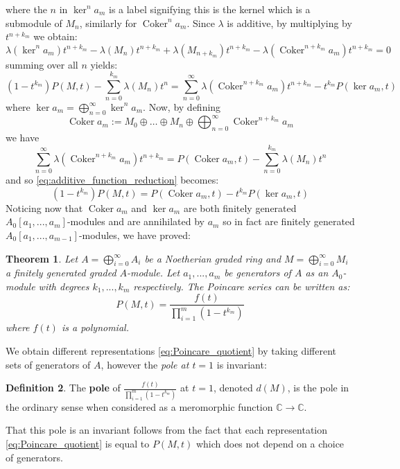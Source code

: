 \documentclass[12pt]{article}
\theoremstyle{plain}
\newtheorem{thm}{Theorem}[subsection] %
\theoremstyle{definition}
\newtheorem{defn}[thm]{Definition} %
\newcommand{\bb}[1]{\mathbb{#1}}
\newcommand{\lto}{\longrightarrow}
\begin{document}
where the $n$ in $\ker^n a_m$ is a label signifying this is the kernel which is a submodule of $M_n$, similarly for $\operatorname{Coker}^n a_m$. Since $\lambda$ is additive, by multiplying by $t^{n+k_m}$ we obtain:
\[\lambda (\ker^n a_m)t^{n+k_m} - \lambda (M_n)t^{n+k_m} + \lambda (M_{n+k_m})t^{n+k_m} - \lambda (\operatorname{Coker}^{n + k_m} a_{m})t^{n + k_m} = 0\]
summing over all $n$ yields:
\begin{equation}
\label{eq:additive_function_reduction}
    (1 - t^{k_m})P(M,t) - \sum_{n = 0}^{k_m}\lambda(M_n)t^n = \sum_{n = 0}^\infty\lambda (\operatorname{Coker}^{n + k_m} a_{m})t^{n + k_m} - t^{k_m}P(\ker a_m, t)
\end{equation}
where $\ker a_m = \bigoplus_{n = 0}^\infty \ker^n a_m$. Now, by defining
\[\operatorname{Coker }a_m := M_0 \oplus \hdots \oplus M_n \oplus \bigoplus_{n = 0}^\infty \operatorname{Coker}^{n+k_m}a_m\]
we have
\[
\label{eq:clever_graded_module} \sum_{n = 0}^\infty\lambda (\operatorname{Coker}^{n + k_m} a_{m})t^{n + k_m} = P(\operatorname{Coker}a_m,t) - \sum_{n = 0}^{k_m}\lambda(M_n)t^n
\]
and so \eqref{eq:additive_function_reduction} becomes:
\begin{equation}
    \label{eq:generation_reduction} (1 - t^{k_m})P(M,t) = P(\operatorname{Coker}a_m,t) - t^{k_m}P(\ker a_m, t)
\end{equation}
Noticing now that $\operatorname{Coker}a_m$ and $\ker a_m$ are both finitely generated $A_0[a_1,...,a_m]$-modules and are annihilated by $a_m$ so in fact are finitely generated $A_0[a_1,...,a_{m-1}]$-modules, we have proved:
\begin{thm}
\label{thm:Hilbert_Serre}
Let $A = \bigoplus_{i = 0}^\infty A_i$ be a Noetherian graded ring and $M = \bigoplus_{i = 0}^\infty M_i$ a finitely generated graded $A$-module. Let $a_1,...,a_m$ be generators of $A$ as an $A_0$-module with degrees $k_1,...,k_m$ respectively. The Poincare series can be written as:
\begin{equation}
\label{eq:Poincare_quotient}
P(M,t) = \frac{f(t)}{\prod_{i = 1}^m(1 - t^{k_m})}
\end{equation}
where $f(t)$ is a polynomial.
\end{thm}
We obtain different representations \eqref{eq:Poincare_quotient} by taking different sets of generators of $A$, however the \emph{pole at $t = 1$} is invariant:
\begin{defn}
The \textbf{pole} of $\frac{f(t)}{\prod_{i = 1}^m(1 - t^{k_m})}$ at $t = 1$, denoted $d(M)$, is the pole in the ordinary sense when considered as a meromorphic function $\bb{C} \lto \bb{C}$.
\end{defn}
That this pole is an invariant follows from the fact that each representation \eqref{eq:Poincare_quotient} is equal to $P(M,t)$ which does not depend on a choice of generators.
\end{document}
